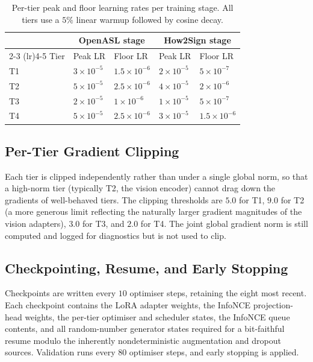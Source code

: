 \documentclass{article}
\begin{document}
\begin{table}[h]
\centering
\caption{Per-tier peak and floor learning rates per training stage. All
tiers use a $5\%$ linear warmup followed by cosine decay.}
\label{tab:lr-schedule}
\begin{tabular}{l l l l l}
\toprule
       & \multicolumn{2}{c}{OpenASL stage} & \multicolumn{2}{c}{How2Sign stage} \\
\cmidrule(lr){2-3} \cmidrule(lr){4-5}
Tier   & Peak LR     & Floor LR        & Peak LR     & Floor LR        \\
\midrule
T1     & $3 \times 10^{-5}$ & $1.5 \times 10^{-6}$ & $2 \times 10^{-5}$ & $5 \times 10^{-7}$ \\
T2     & $5 \times 10^{-5}$ & $2.5 \times 10^{-6}$ & $4 \times 10^{-5}$ & $2 \times 10^{-6}$ \\
T3     & $2 \times 10^{-5}$ & $1 \times 10^{-6}$   & $1 \times 10^{-5}$ & $5 \times 10^{-7}$ \\
T4     & $5 \times 10^{-5}$ & $2.5 \times 10^{-6}$ & $3 \times 10^{-5}$ & $1.5 \times 10^{-6}$ \\
\bottomrule
\end{tabular}
\end{table}

\subsection{Per-Tier Gradient Clipping}
\label{sec:train-clip}

Each tier is clipped independently rather than under a single global norm,
so that a high-norm tier (typically T2, the vision encoder) cannot drag
down the gradients of well-behaved tiers. The clipping thresholds are
$5.0$ for T1, $9.0$ for T2 (a more generous limit reflecting the
naturally larger gradient magnitudes of the vision adapters), $3.0$ for
T3, and $2.0$ for T4. The joint global gradient norm is still computed and
logged for diagnostics but is not used to clip.

\subsection{Checkpointing, Resume, and Early Stopping}
\label{sec:train-ckpt}

Checkpoints are written every $10$ optimiser steps, retaining the eight
most recent. Each checkpoint contains the LoRA adapter weights, the
InfoNCE projection-head weights, the per-tier optimiser and scheduler
states, the InfoNCE queue contents, and all random-number generator states
required for a bit-faithful resume modulo the inherently nondeterministic
augmentation and dropout sources. Validation runs every $80$ optimiser
steps, and early stopping is applied.
\end{document}
